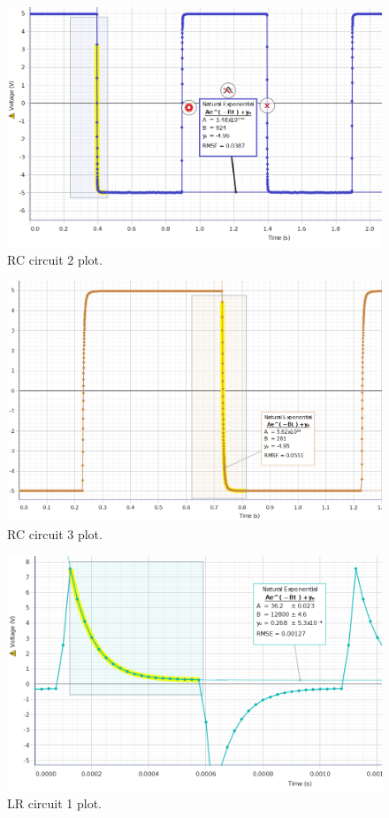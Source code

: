 \documentclass[12pt]{article}
\begin{document}
        \begin{figure}[H]
            \centering
            \includegraphics[width=0.75\linewidth]{RC2.png}
            \caption{RC circuit 2 plot.}
        \end{figure}
        \begin{figure}[H]
            \centering
            \includegraphics[width=0.75\linewidth]{RC3.png}
            \caption{RC circuit 3 plot.}
        \end{figure}
        \begin{figure}[H]
            \centering
            \includegraphics[width=0.75\linewidth]{LR1.png}
            \caption{LR circuit 1 plot.}
        \end{figure}
\end{document}
